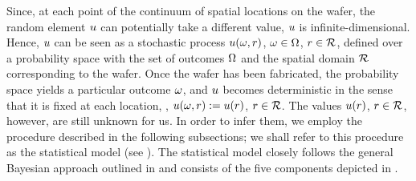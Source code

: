 
Since, at each point of the continuum of spatial locations on the wafer, the random element $u$ can potentially take a different value, $u$ is infinite-dimensional.
Hence, $u$ can be seen as a stochastic process $u(\omega, r)$, $\omega \in \Omega$, $r \in \mathcal{R}$, defined over a probability space with the set of outcomes $\Omega$ \cite{durrett2010} and the spatial domain $\mathcal{R}$ corresponding to the wafer.
Once the wafer has been fabricated, the probability space yields a particular outcome $\omega$, and $u$ becomes deterministic in the sense that it is fixed at each location, \ie, $u(\omega, r) := u(r)$, $r \in \mathcal{R}$.
The values $u(r)$, $r \in \mathcal{R}$, however, are still unknown for us.
In order to infer them, we employ the procedure described in the following subsections; we shall refer to this procedure as the statistical model (see ). The statistical model closely follows the general Bayesian approach outlined in  and consists of the five components depicted in .

